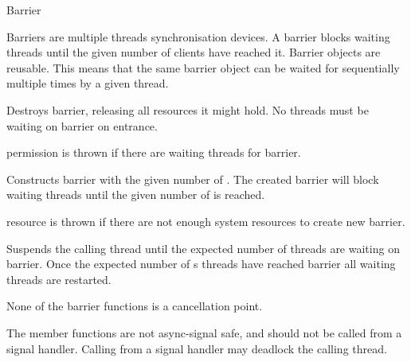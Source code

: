 
\begin{classpage}{Barrier}

Barriers are multiple threads synchronisation devices. A barrier
blocks waiting threads until the given number of clients have reached
it. Barrier objects are reusable. This means that the same barrier
object can be waited for sequentially multiple times by a given
thread.


\begin{mandescription}
  \destructor
  Destroys  barrier, releasing all resources it might
  hold. No threads must be waiting on  barrier on
  entrance.
  \begin{exception}
    \item[permission] is thrown if there are
      waiting threads for  barrier.
  \end{exception}

  Constructs  barrier with the given number of
  . The created barrier will block waiting threads
  until the given number of  is reached.
  \begin{exception}
    \item[resource] is thrown if there are not
      enough system resources to create  new barrier.
  \end{exception}

  Suspends the calling thread until the expected number of  threads are waiting on  barrier. 
  Once the expected number of s threads have reached  barrier all waiting threads are restarted.
\end{mandescription}

None of the barrier functions is a cancellation point.

The  member functions are not async-signal safe, and
should not be called from a signal handler. Calling
 from a signal handler may deadlock the
calling thread.

\end{classpage}
